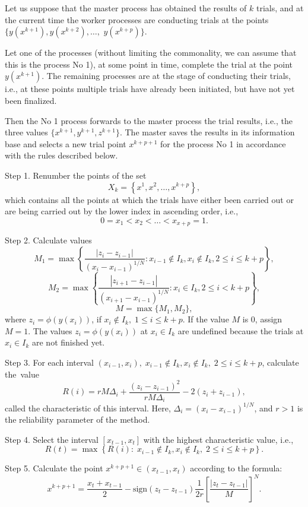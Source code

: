 \documentclass[mathematics,article,accept,pdftex,moreauthors]{Definitions/mdpi}
\begin{document}
	Let us suppose that the master process has obtained the results of $k$ trials, and at the current time the worker processes are conducting trials at the points
	$\{y(x^{k+1}), y(x^{k+2}), \dots,$ $y(x^{k+p})\}$.
	
	Let one of the processes (without limiting the commonality, we can assume that this is the process No 1), at some point in time, complete the trial at the point $y(x^{k+1})$.
	The remaining processes are at the stage of conducting their trials, i.e., at these points multiple trials have already been initiated, but have not yet been finalized.
	
	Then the No 1 process forwards to the master process the trial results, i.e., the three values $\{x^{k+1},y^{k+1},z^{k+1}\}$.
	The master saves the results in its information base and selects a new trial point $x^{k+p+1}$ for the process No 1 in accordance with the rules described below.
	
	Step 1. Renumber {t}he points of the set 
	\[
	X_k = \left\{x^1, x^2,\dots,x^{k+p} \right\},
	\]
	which contains all the points at which the trials have either been carried out or are being carried out by the lower index in ascending order, i.e.,
	\[
	0=x_1<x_2<\dots<x_{x+p}=1.
	\]
	
	Step 2. Calculate values
	\[
	M_1=\max \left\{ \frac{ \left|z_i - z_{i-1} \right|}{(x_i-x_{i-1})^{1/N}} : x_{i-1} \notin I_k, x_i \notin I_k, 2\leq i\leq k+p \right\},
	\]
	\[
	M_2=\max \left\{ \frac{ \left|z_{i+1} - z_{i-1} \right|}{(x_{i+1}-x_{i-1})^{1/N}} : x_i \in I_k, 2\leq i < k+p \right\},
	\]
	\[
	M=\max\{M_1,M_2\},
	\]
	where $z_i=\phi(y(x_i))$, if $x_i \notin I_k, \; 1\leq i \leq k+p$.  If the value $M$ is 0, assign $M=1$. The values $z_i=\phi(y(x_i))$ at $x_i \in I_k$ are undefined because the trials at $x_i \in I_k$ are not finished yet.
	
	Step 3. For each interval $(x_{i-1},x_i), \; x_{i-1} \notin I_k, x_i \notin I_k, \; 2\leq i\leq k+p$, calculate the~value 
	\[
	R(i)=rM\Delta_i+\frac{(z_i-z_{i-1})^2}{rM\Delta_i}-2(z_i+z_{i-1}),
	\]
	called the characteristic of this interval. Here, $\Delta_i=\left(x_i-x_{i-1}\right)^{1/N}$, and $r>1$ is the reliability parameter of the method.
	
	Step 4. Select the interval $[x_{t-1},x_t]$ with the highest characteristic value, i.e.,
	\[
	R(t) = \max \left\{ R(i): \; x_{i-1} \notin I_k, x_i \notin I_k, \; 2\leq i\leq k+p \right\}.
	\]
	
	Step 5. Calculate the point $x^{k+p+1} \in (x_{t-1},x_t)$ according to the formula:
	\[
	x^{k+p+1} = \frac{x_{t}+x_{t-1}}{2} - \mathrm{sign}(z_{t}-z_{t-1})\frac{1}{2r}\left[\frac{\left|z_{t}-z_{t-1}\right|}{M}\right]^N.
	\]
	
\end{document}

